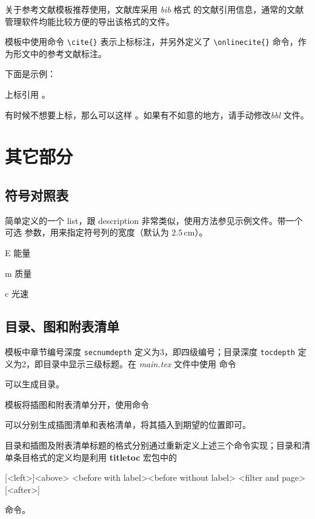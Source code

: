 关于参考文献模板推荐使用\BibTeX{}，文献库采用 \emph{bib} 格式
的文献引用信息，通常的文献管理软件均能比较方便的导出该格式的文件。

模板中使用命令 \verb|\cite{}| 表示上标标注，并另外定义了 \verb|\onlinecite{}|
命令，作为形文中的参考文献标注。

下面是示例：

上标引用 \cite{chen2001,nadkarni1992,hua1973,zhu1973,huo1981,timoshenko1959,zhang1991,dupont1974,ding2001,cairns1965,patent,standard,wang2005}。

有时候不想要上标，那么可以这样 。如果有不如意的地方，请手动修改\emph{bbl} 文件。

\section{其它部分}
\label{sec:otherparts}

\subsection*{符号对照表}

简单定义的一个 list，跟 description 非常类似，使用方法参见示例文件。带一个可选
参数，用来指定符号列的宽度（默认为 $2.5\,\mathrm{cm}$）。
\begin{latex}
\begin{denotation}[1.5cm]
  \item[E] 能量
  \item[m] 质量
  \item[c] 光速
\end{denotation}
\end{latex}

\subsection*{目录、图和附表清单}

模板中章节编号深度 \texttt{secnumdepth} 定义为3，即四级编号；目录深度
\texttt{tocdepth} 定义为2，即目录中显示三级标题。在 \emph{main.tex} 文件中使用
命令 
\begin{latex}
\tableofcontents
\end{latex}
可以生成目录。

模板将插图和附表清单分开，使用命令 
\begin{latex}
\listoffigures
\listoftables
\end{latex}
可以分别生成插图清单和表格清单，将其插入到期望的位置即可。

目录和插图及附表清单标题的格式分别通过重新定义上述三个命令实现；目录和清单条目格式的定义均是利用 \textbf{titletoc} 宏包中的
\begin{latex}
[<left>]{<above>}
              {<before with label>}{<before without label>}
              {<filter and page>}[<after>]
\end{latex}
命令。


